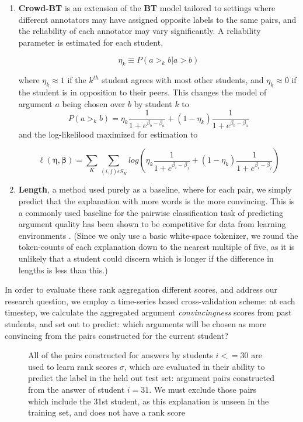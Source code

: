 \documentclass[notitlepage,12pt]{jedm}
\begin{document}
\begin{enumerate}
	\item \textbf{Crowd-BT} \cite{chen_pairwise_2013} is an extension of the 
	\textbf{BT} model tailored to settings where different annotators may have 
	assigned opposite labels to the same pairs, and the reliability of each 
	annotator may vary significantly. 
	A reliability parameter is estimated for each student, 
	
	$$
	\eta_k \equiv P(a >_k b | a >b )
	$$
	
	where $\eta_k \approx 1$ if the $k^{th}$ student agrees with most other 
	students, and $\eta_k \approx 0$ if the student is in opposition to their 
	peers.
	This changes the model of argument $a$ being chosen over $b$ by student $k$ 
	to 
	$$
	P(a >_k b) = 
	\eta_k \frac{1}{1+e^{\beta_b-\beta_a}} + (1-\eta_k) 
	\frac{1}{1+e^{\beta_b-\beta_a}}
	$$
	and the log-likelilood maximized for estimation to 
	
	$$
	\ell(\boldsymbol{\eta},\boldsymbol{\beta})=\sum_{K}\sum_{(i,j)\epsilon 
		S_K}^{} 
	log(\eta_k\frac{1}{1+e^{\beta_i - \beta_j}} + 
	(1-\eta_k)\frac{1}{1+e^{\beta_i - \beta_j}})
	$$
	
	\item \textbf{Length}, a method used purely as a baseline, where for each 
	pair, we simply predict that the explanation with more words is the more 
	convincing.
	This is a commonly used baseline  for the pairwise classification task of 
	predicting argument quality \cite{toledo_automatic_2019} has been shown to 
	be competitive for data from learning environments 
	\cite{bhatnagar_learnersourcing_2020}.
	(Since we only use a basic white-space tokenizer, we round the token-counts 
	of each explanation down to the nearest multiple of five, as it is unlikely 
	that a student could discern which is longer if the difference in lengths 
	is less than this.)
\end{enumerate}

In order to evaluate these rank aggregation different scores, and address 
our research question, we employ a time-series based cross-validation scheme:
at each timestep, we calculate the aggregated argument \textit{convincingness} 
scores from past students, and set out to predict: which arguments will be 
chosen as more convincing from the pairs constructed for the current student?  



\begin{figure}
	\centering
	\def\svgscale{0.5}
	
	\caption{
		All of the pairs constructed for answers by students $i<=30$ are used 
		to learn rank scores $\sigma$, which are evaluated in their ability to 
		predict the label in the held out test set: argument pairs constructed 
		from the answer of student $i=31$.
		We must exclude those pairs which include the 31st student, as this 
		explanation is unseen in the training set, and does not have a rank 
		score 
	}
	\label{fig:make_pairs_time_series}
\end{figure}
\end{document}
